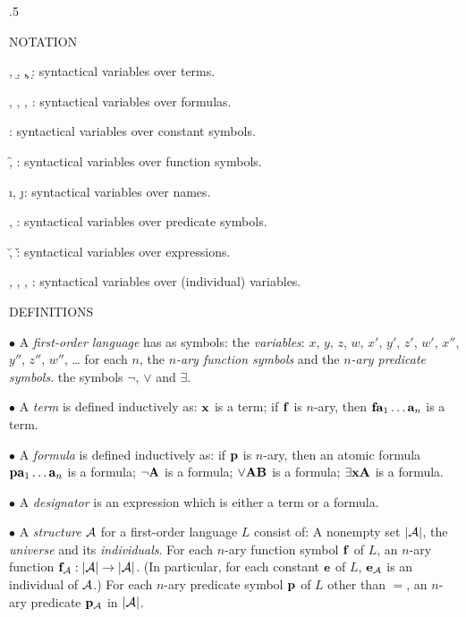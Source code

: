 \vglue .5\baselineskip 

\beginsection NOTATION

{\leftskip 1in
\item{\a, \b, \c, \d:} syntactical variables over terms.
\item{\A, \B, \C, \D:} syntactical variables over formulas.
\item{\e:} syntactical variables over constant symbols.
\item{\f, \g:} syntactical variables over function symbols.
\item{\i, \j:} syntactical variables over names.
\item{\p, \q:} syntactical variables over predicate symbols.
\item{\u, \v:} syntactical variables over expressions.
\item{\x, \y, \z, \w:} syntactical variables over (individual) variables.
\par}

\beginsection DEFINITIONS

\item{$\bullet$} A {\it first-order language} has as symbols:
 the {\it variables}: $x$, $y$, $z$, $w$, $x'$, $y'$, $z'$, $w'$, $x''$, $y''$, $z''$, $w''$, \dots
{} for each $n$, the $n${\it-ary function symbols} and the $n${\it-ary predicate symbols}.
 the symbols $\neg$, $\lor$ and $\exists$.
\smallskip

\item{$\bullet$} A {\it term} is defined inductively as:
 ${\bf x}$ is a term;
 if ${\bf f}$ is $n$-ary, then ${\bf f}{\bf a}_1 \dots {\bf a}_n$ is a term.
\smallskip

\item{$\bullet$} A {\it formula} is defined inductively as:
 if ${\bf p}$ is $n$-ary, then an atomic formula ${\bf p}{\bf a}_1 \dots {\bf a}_n$ is a formula;
 $\neg {\bf A}$ is a formula;
 $\lor{\bf A}{\bf B}$ is a formula;
 $\exists {\bf x}{\bf A}$ is a formula.
\smallskip

\item{$\bullet$} A {\it designator} is an expression which is either a term or a formula.
\smallskip

\item{$\bullet$} A {\it structure} $\cal A$ for a first-order language $L$ consist of:
 A nonempty set $|{\cal A}|$, the {\it universe} and its {\it individuals}.
 For each $n$-ary function symbol ${\bf f}$ of $L$, an $n$-ary function 
${\bf f}_{\cal A} : |{\cal A}| \to |{\cal A}|$. (In particular, for each constant 
${\bf e}$ of $L$, ${\bf e}_{\cal A}$ is an individual of $\cal A$.)
 For each $n$-ary predicate symbol ${\bf p}$ of $L$ other than $=$, an 
$n$-ary predicate ${\bf p}_{\cal A}$ in $|{\cal A}|$.


